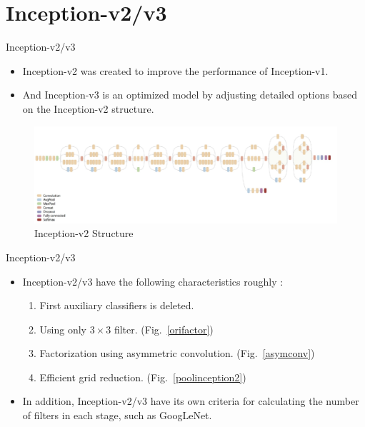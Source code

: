 \documentclass{beamer}
\begin{document}
\section{Inception-v2/v3}
\begin{frame}{Inception-v2/v3}
	\begin{itemize}
		\item Inception-v2\cite{v2_v3} was created to improve the performance of Inception-v1.
		\item And Inception-v3\cite{v2_v3} is an optimized model by adjusting detailed options based on the Inception-v2 structure.
	\end{itemize}
	\vspace{10pt}
	\begin{figure}[h]		
		\centering
		\includegraphics[scale=0.45]{./v2_v3/inception_v2.PNG}
		\caption{Inception-v2 Structure}
		\label{inceptionv2}
	\end{figure}
\end{frame}


\begin{frame}{Inception-v2/v3}
	\begin{itemize}
		\item Inception-v2/v3 have the following characteristics roughly :
		\begin{enumerate}
			\item First auxiliary classifiers is deleted.
			\item Using only $3 \times 3$ filter. (Fig.~\ref{orifactor})
			\item Factorization using asymmetric convolution. (Fig.~\ref{asymconv})
			\item Efficient grid reduction. (Fig.~\ref{poolinception2})
		\end{enumerate}
		\item In addition, Inception-v2/v3 have its own criteria for calculating the number of filters in each stage, such as GoogLeNet.
	\end{itemize}
\end{frame}
\end{document}
